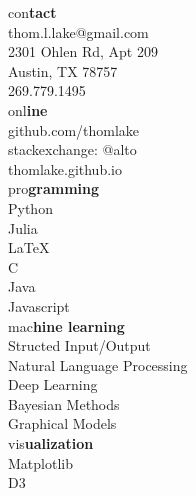 \documentclass[10pt]{article}
\makeatletter
\newcommand{\heada}[1]{\textcolor{shadecolor}{\LARGE{#1}}}
\newcommand{\headb}[1]{\textcolor{shadecolor}{\textbf{\LARGE{#1}}}}
\newcommand\tabfill[1]{%
\dimen@\linewidth%
\advance\dimen@\@totalleftmargin%
\advance\dimen@-\dimen\@curtab%
\parbox[t]\dimen@{#1\ifhmode\strut\fi}%
}
\makeatother
\begin{document}
\begin{paracol}{2}
\begin{leftcolumn}
    \begin{flushright}
        \heada{con}\headb{tact}\\[0.5cm]
        thom.l.lake@gmail.com\\
        2301 Ohlen Rd, Apt 209\\
        Austin, TX 78757\\
        269.779.1495\\[0.5cm]
        \heada{onl}\headb{ine}\\[0.5cm]
        github.com/thomlake\\
        stackexchange: @alto\\
        thomlake.github.io\\[0.5cm]
        \heada{pro}\headb{gramming}\\[0.5cm]
        Python\\[0.0cm]
        Julia\\
        \LaTeX\\
        C\\
        Java\\
        Javascript\\[0.5cm]
        \heada{mac}\headb{hine learning}\\[0.5cm]
        Structed Input\;/\;Output\\
        Natural Language Processing\\
        Deep Learning\\
        Bayesian Methods\\
        Graphical Models\\[0.5cm]
        \heada{vis}\headb{ualization}\\[0.5cm]
        Matplotlib\\
        D3\\[0.5cm]
    \end{flushright}
\end{leftcolumn}
\begin{rightcolumn}
\end{rightcolumn}
\end{paracol}
\end{document}
